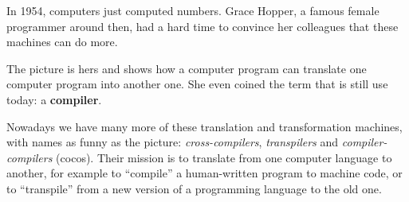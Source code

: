 
In 1954, computers just computed numbers. Grace Hopper, a famous
female programmer around then, had a hard time to convince her
colleagues that these machines can do more.

The picture is hers and shows how a computer program can translate
one computer program into another one. She even coined the term that is still use
today: a \textbf{compiler}.

Nowadays we have many more of these translation and transformation
machines, with names as funny as the picture: \emph{cross-compilers},
\emph{transpilers} and \emph{compiler-compilers} (cocos). Their mission is to
translate from one computer language to another, for example
to ``compile'' a human-written program to machine code, or to
``transpile'' from a new version of a programming language to the old one.


